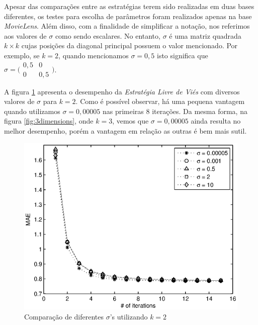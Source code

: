Apesar das comparações entre as estratégias terem sido realizadas em duas bases diferentes, os testes para escolha de parâmetros foram realizados apenas na base \textit{MovieLens}. Além disso, com a finalidade de simplificar a notação, nos referimos aos valores de $\sigma$ como sendo escalares. No entanto, $\sigma$ é uma matriz quadrada $k \times k$ cujas posições da diagonal principal possuem o valor mencionado. Por exemplo, se $k = 2$, quando mencionamos $\sigma=0,5$ isto significa que $\sigma = \bigl(\begin{smallmatrix} 0,5&0\\ 0&0,5 \end{smallmatrix} \bigr)$.

A figura \ref{fig:2dimensions} apresenta o desempenho da \textit{Estratégia Livre de Viés} com diversos valores de $\sigma$ para $k=2$. Como é possível observar, há uma pequena vantagem quando utilizamos $\sigma=0,00005$ nas primeiras 8 iterações. Da mesma forma, na figura \ref{fig:3dimensions}, onde $k=3$, vemos que $\sigma=0,00005$ ainda resulta no melhor desempenho, porém a vantagem em relação as outras é bem mais sutil.  

\begin{figure}[ht]
\centering
\includegraphics{2dimensions.eps}
\caption{Comparação de diferentes $\sigma$'s utilizando $k=2$}
\label{fig:2dimensions}
\end{figure}

